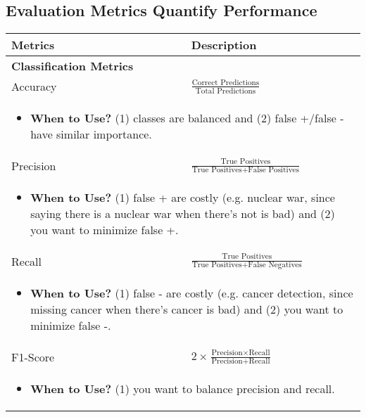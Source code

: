 \subsection{Evaluation Metrics Quantify Performance}
\begin{summary}
    \begin{center}
        \begin{tabular}{ll}
        \toprule
        \textbf{Metrics} & \textbf{Description} \\
        \midrule
        \textbf{Classification Metrics} &  \\
        \midrule 
        Accuracy & $\frac{\text{Correct Predictions}}{\text{Total Predictions}}$ \\
        \multicolumn{2}{p{\linewidth}}{
        \begin{itemize}
            \item \textbf{When to Use?} (1) classes are balanced and (2) false +/false - have similar importance.
        \end{itemize}} \\
        \midrule
        Precision & $\frac{\text{True Positives}}{\text{True Positives} + \text{False Positives}}$ \\
        \multicolumn{2}{p{\linewidth}}{
        \begin{itemize}
            \item \textbf{When to Use?} (1) false + are costly (e.g. nuclear war, since saying there is a nuclear war when there's not is bad) and (2) you want to minimize false +.
        \end{itemize}} \\
        \midrule 
        Recall & $\frac{\text{True Positives}}{\text{True Positives} + \text{False Negatives}}$ \\
        \multicolumn{2}{p{\linewidth}}{
        \begin{itemize}
            \item \textbf{When to Use?} (1) false - are costly (e.g. cancer detection, since missing cancer when there's cancer is bad) and (2) you want to minimize false -.
        \end{itemize}} \\
        \midrule 
        F1-Score & $2 \times \frac{\text{Precision} \times \text{Recall}}{\text{Precision} + \text{Recall}}$ \\
        \multicolumn{2}{p{\linewidth}}{
        \begin{itemize}
            \item \textbf{When to Use?} (1) you want to balance precision and recall.

\end{itemize}}
\end{tabular}
\end{center}
\end{summary}
